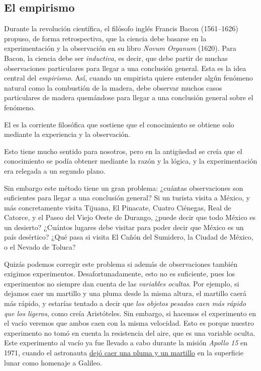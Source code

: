 \subsection*{El empirismo}
\label{sub:elemprismo}
Durante la revolución científica, el filósofo inglés %
{Francis Bacon} (1561--1626) propuso, de forma retrospectiva, que la ciencia
debe basarse en la experimentación y la observación en su libro \emph{Novum
    Organum} (1620).
Para Bacon, la ciencia debe ser \emph{inductiva}, es decir, que debe partir de
muchas observaciones particulares para llegar a una conclusión general.
Esta es la idea central del \emph{empirismo}.
Así, cuando un empirista quiere entender algún fenómeno natural como la
combustión de la madera, debe observar muchos casos particulares de madera
quemándose para llegar a una conclusión general sobre el fenómeno.

\begin{remember}
    \label{rem:empirismo}
    El  es la corriente filosófica que sostiene que el
    conocimiento se obtiene solo mediante la experiencia y la observación.
\end{remember}

Esto tiene mucho sentido para nosotros, pero en la antigüedad se creía que el
conocimiento se podía obtener mediante la razón y la lógica, y la
experimentación era relegada a un segundo plano.

Sin embargo este método tiene un gran problema: ¿cuántas observaciones son
suficientes para llegar a una conclusión general?
Si un turista visita a México, y más concretamente visita Tijuana, El Pinacate,
Cuatro Ciénegas, Real de Catorce, y el Paseo del Viejo Oeste de Durango, ¿puede
decir que todo México es un desierto?
¿Cuántos lugares debe visitar para poder decir que México es un país desértico?
¿Qué pasa si visita El Cañón del Sumidero, la Ciudad de México, o el Nevado de
Toluca?

Quizás podemos corregir este problema si además de observaciones también
exigimos experimentos.
Desafortunadamente, esto no es suficiente, pues los experimentos no siempre dan
cuenta de las \emph{variables ocultas}.
Por ejemplo, si dejamos caer un martillo y una pluma desde la misma altura, el
martillo caerá más rápido, y estarías tentado a decir que \emph{los objetos
    pesados caen más rápido que los ligeros}, como creía Aristóteles.
Sin embargo, si hacemos el experimento en el vacío veremos que ambos caen con
la misma velocidad.
Esto es porque nuestro experimento no tomó en cuenta la resistencia del aire,
que es una variable oculta.
Este experimento al vacío ya fue llevado a cabo durante la misión
\emph{Apollo 15} en 1971, cuando el astronauta 
\href{https://youtu.be/Oo8TaPVsn9Y}{ dejó caer una pluma y un martillo} en la
superficie lunar como homenaje a Galileo.

